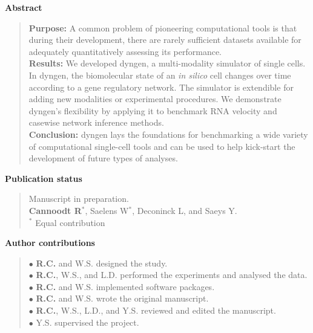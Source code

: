 \documentclass[10pt]{book}
\newif\ifrenderall
\begin{document}
{\large \textbf{Abstract}}
\begin{quote}
	\textbf{Purpose:} A common problem of pioneering computational tools is that during their development, there are rarely sufficient datasets available for adequately quantitatively assessing its performance. \\
	\textbf{Results:} We developed dyngen, a multi-modality simulator of single cells. In dyngen, the biomolecular state of an \textit{in silico} cell changes over time according to a gene regulatory network. The simulator is extendible for adding new modalities or experimental procedures. We demonstrate dyngen's flexibility by applying it to benchmark RNA velocity and casewise network inference methods. \\
	\textbf{Conclusion:} dyngen lays the foundations for benchmarking a wide variety of computational single-cell tools and can be used to help kick-start the development of future types of analyses.
\end{quote}
%
{\large \textbf{Publication status}}
\begin{quote}
	Manuscript in preparation. \\
	\textbf{Cannoodt R}$^*$, Saelens W$^*$, Deconinck L, and Saeys Y.  \\
	{\footnotesize $^*$ Equal contribution}
\end{quote}
%
{\large \textbf{Author contributions}}
\begin{quote}
	$\bullet$ \textbf{R.C.} and W.S. designed the study.\\
	$\bullet$ \textbf{R.C.}, W.S., and L.D. performed the experiments and analysed the data.\\
	$\bullet$ \textbf{R.C.} and W.S. implemented software packages.\\
	$\bullet$ \textbf{R.C.} and W.S. wrote the original manuscript.\\
	$\bullet$ \textbf{R.C.}, W.S., L.D., and Y.S. reviewed and edited the manuscript. \\
	$\bullet$ Y.S. supervised the project.
\end{quote}

\vfill

\ifrenderall
\newpage
\graphicspath{{./ch2_dyngen/}}

\fi
\newpage{\thispagestyle{empty}\cleardoublepage}
\end{document}
